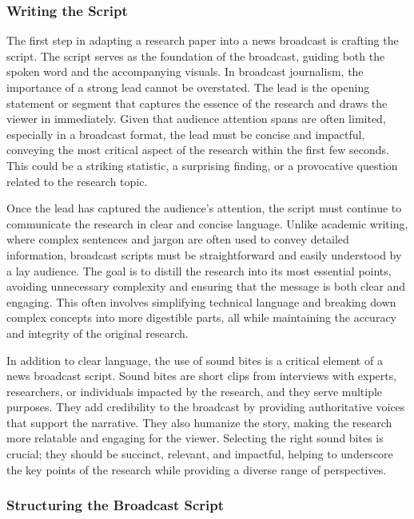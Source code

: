 \documentclass[
]{book}
\begin{document}
\subsubsection*{Writing the Script}\label{writing-the-script}

The first step in adapting a research paper into a news broadcast is crafting the script. The script serves as the foundation of the broadcast, guiding both the spoken word and the accompanying visuals. In broadcast journalism, the importance of a strong lead cannot be overstated. The lead is the opening statement or segment that captures the essence of the research and draws the viewer in immediately. Given that audience attention spans are often limited, especially in a broadcast format, the lead must be concise and impactful, conveying the most critical aspect of the research within the first few seconds. This could be a striking statistic, a surprising finding, or a provocative question related to the research topic.

Once the lead has captured the audience's attention, the script must continue to communicate the research in clear and concise language. Unlike academic writing, where complex sentences and jargon are often used to convey detailed information, broadcast scripts must be straightforward and easily understood by a lay audience. The goal is to distill the research into its most essential points, avoiding unnecessary complexity and ensuring that the message is both clear and engaging. This often involves simplifying technical language and breaking down complex concepts into more digestible parts, all while maintaining the accuracy and integrity of the original research.

In addition to clear language, the use of sound bites is a critical element of a news broadcast script. Sound bites are short clips from interviews with experts, researchers, or individuals impacted by the research, and they serve multiple purposes. They add credibility to the broadcast by providing authoritative voices that support the narrative. They also humanize the story, making the research more relatable and engaging for the viewer. Selecting the right sound bites is crucial; they should be succinct, relevant, and impactful, helping to underscore the key points of the research while providing a diverse range of perspectives.

\subsubsection*{Structuring the Broadcast Script}\label{structuring-the-broadcast-script}
\end{document}
